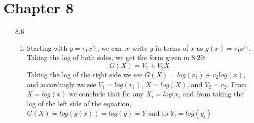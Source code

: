 \documentclass[11pt,a4paper]{article}
\begin{document}
	\section{Chapter 8}
		\begin{itemize}
			\item[8.6]
				\begin{enumerate}
					\item Starting with $y=v_1x^{v_2}$, we can re-write $y$ in terms of $x$ as $g(x)=v_1x^{v_2}$. Taking the log of both sides, we get the form given in $8.29$:
					$$G(X) = V_1 + V_2X$$
					Taking the log of the right side we see $G(X) = log(v_1) + v_2log(x)$, and accordingly we see $V_1=log(v_1)$, $X = log(X)$, and $V_2 = v_2$. From $X = log(x)$ we conclude that for any $X_i = log(x_i$ and from taking the log of the left side of the equation, $G(X) = log(g(x)) = log(y) = Y$ and so $Y_i = log(y_i)$
				\end{enumerate}
		\end{itemize}	
\end{document}
